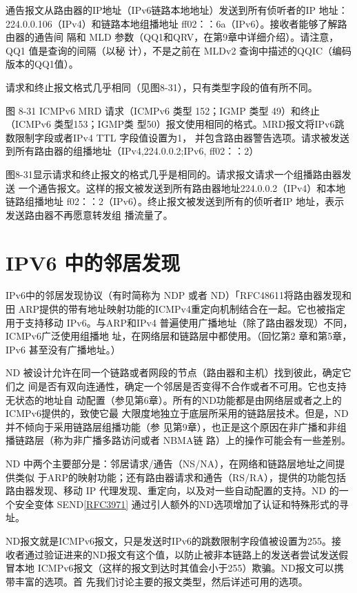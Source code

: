 通告报文从路由器的IP地址（IPv6链路本地地址）发送到所有侦听者的IP 地址：
224.0.0.106（IPv4）和链路本地组播地址 ff02：：6a（IPv6）。接收者能够了解路由器的通告间
隔和 MLD 参数（QQ1和QRV，在第9章中详细介绍）。请注意，QQ1 值是查询的间隔（以秘
计），不是之前在 MLDv2 查询中描述的QQIC（编码版本的QQ1值）。

请求和终止报文格式几乎相同（见图8-31），只有类型字段的值有所不同。

图 8-31
ICMPv6 MRD 请求（ICMPv6 类型 152；IGMP 类型 49）和终止（ICMPv6 类型153；IGMP类
型50）报文使用相同的格式。MRD报文将IPv6跳数限制字段或者IPv4 TTL 字段值设置为1，
并包含路由器警告选项。请求被发送到所有路由器的组播地址（IPv4,224.0.0.2;IPv6, ff02：：2）

图8-31显示请求和终止报文的格式几乎是相同的。请求报文请求一个组播路由器发送
一个通告报文。这样的报文被发送到所有路由器地址224.0.0.2（IPv4）和本地链路组播地址
f02：：2（IPv6）。终止报文被发送到所有的侦听者IP 地址，表示发送路由器不再愿意转发组
播流量了。

\section{IPV6 中的邻居发现}

IPv6中的邻居发现协议（有时简称为 NDP 或者 ND）「RFC48611将路由器发现和田
ARP提供的带有地址映射功能的ICMPv4重定向机制结合在一起。它也被指定用于支持移动
IPv6。与ARP和IPv4 普遍使用广播地址（除了路由器发现）不同，ICMPv6广泛使用组播地
址，在网络层和链路层中都使用。（回忆第2 章和第5章，IPv6 甚至没有广播地址。）

ND 被设计允许在同一个链路或者网段的节点（路由器和主机）找到彼此，确定它们之
间是否有双向连通性，确定一个邻居是否变得不合作或者不可用。它也支持无状态的地址自
动配置（参见第6章）。所有的ND功能都是由网络层或者之上的ICMPv6提供的，致使它最
大限度地独立于底层所采用的链路层技术。但是，ND 并不倾向于采用链路层组播功能（参
见第9章），也正是这个原因在非广播和非组播链路层（称为非广播多路访问或者 NBMA链
路）上的操作可能会有一些差别。

ND 中两个主要部分是：邻居请求/通告（NS/NA），在网络和链路层地址之间提供类似
于ARP的映射功能；还有路由器请求和通告（RS/RA），提供的功能包括路由器发现、移动
IP 代理发现、重定向，以及对一些自动配置的支持。ND 的一个安全变体 SEND\href{https://www.rfc-editor.org/rfc/rfc3971}{[RFC3971]}
通过引人额外的ND选项增加了认证和特殊形式的寻址。

ND报文就是ICMPv6报文，只是发送时IPv6的跳数限制字段值被设置为255。接
收者通过验证进来的ND报文有这个值，以防止被非本链路上的发送者尝试发送假冒本地
ICMPv6报文（这样的报文到达时其值会小于255）欺骗。ND报文可以携带丰富的选项。首
先我们讨论主要的报文类型，然后详述可用的选项。

